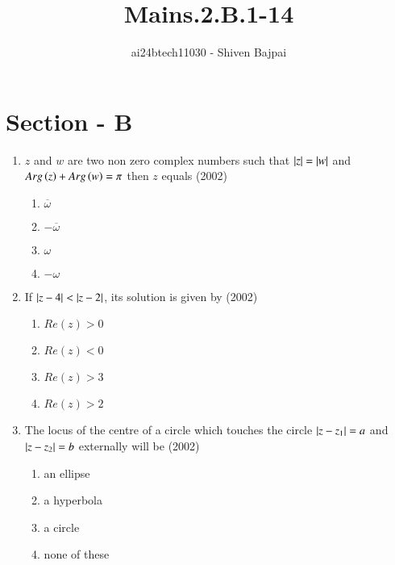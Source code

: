 \documentclass[journal]{IEEEtran}
\begin{document}
\onecolumn

\vspace{3cm}

\renewcommand{\thefigure}{\theenumi}
\renewcommand{\thetable}{\theenumi}

\title{Mains.2.B.1-14}
\author{ai24btech11030 - Shiven Bajpai}
\maketitle

\section*{Section - B}

\begin{enumerate}
	\item{$z$ and $w$ are two non zero complex numbers such that $\left\vert z\right\vert = \left\vert w\right\vert$ and $Arg\left(z\right) + Arg\left(w\right) = \pi$ then $z$ equals \hfill (2002)
		\begin{multicols}{4}
		\begin{enumerate}
			\item{$\overline{\omega}$} \columnbreak \item{$-\overline{\omega}$} \columnbreak \item{$\omega$} \columnbreak \item{$-\omega$}
		\end{enumerate}
		\end{multicols}
		}
		
	\item{If $\left\vert z-4\right\vert<\left\vert z-2\right\vert$, its solution is given by \hfill (2002)
		\begin{multicols}{4}
		\begin{enumerate}
			\item{$Re(z)>0$} 
			\columnbreak
			\item{$Re(z)<0$}
			\columnbreak
			\item{$Re(z)>3$}
			\columnbreak
			\item{$Re(z)>2$}
		\end{enumerate}
		\end{multicols}}
		
	\item{The locus of the centre of a circle which touches the circle $\left\vert z-z_1\right\vert=a$ and $\left\vert z-z_2\right\vert=b$ externally  will be \hfill (2002)
		\begin{multicols}{4}
		\begin{enumerate}
			\item{an ellipse}
			\columnbreak
			\item{a hyperbola} 
			\columnbreak
			\item{a circle}
			\columnbreak
			\item{none of these}
		\end{enumerate}
		\end{multicols}}
		

\end{enumerate}
\end{document}
